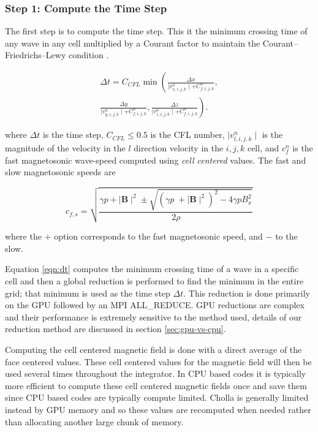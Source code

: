 \subsubsection{Step 1: Compute the Time Step}
\label{vlct:dt}

The first step is to compute the time step. This it the minimum crossing time of any wave in any cell multiplied by a Courant factor to maintain the Courant–Friedrichs–Lewy condition \cite{cfl}.

\begin{equation}
    \begin{aligned}
        \label{eqn:dt}
        \Delta t = C_{CFL} \min \left(
            \frac{\Delta x}{\mid v^n_{x,i,j,k} \mid + C^n_{f,i,j,k}}, \right. \\ \left.
            \frac{\Delta y}{\mid v^n_{y,i,j,k} \mid + C^n_{f,i,j,k}}, 
            \frac{\Delta z}{\mid v^n_{z,i,j,k} \mid + C^n_{f,i,j,k}}
        \right).
    \end{aligned}
\end{equation}

\noindent where $\Delta t$ is the time step, $C_{CFL} \leq 0.5$ is the CFL number, $\mid v^n_{l,i,j,k}\mid $ is the magnitude of the velocity in the $l$ direction velocity in the ${i,j,k}$ cell, and $c^n_f $ is the fast magnetosonic wave-speed computed using \emph{cell centered} values. The fast and slow magnetosonic speeds are

\begin{equation}
    c_{f,s} = \sqrt{\frac
    {\gamma p + \mid \boldsymbol{B} \mid^2 \pm \sqrt{\left( \gamma p \;+ \mid \boldsymbol{B} \mid^2 \right)^2 - 4\gamma p B_x^2 } }
    {2\rho}}
\end{equation}

\noindent where the $+$ option corresponds to the fast magnetosonic speed, and $-$ to the slow.

Equation \ref{eqn:dt} computes the minimum crossing time of a wave in a specific cell and then a global reduction is performed to find the minimum in the entire grid; that minimum is used as the time step $\Delta t$. This reduction is done primarily on the GPU followed by an MPI ALL\_REDUCE. GPU reductions are complex and their performance is extremely sensitive to the method used, details of our reduction method are discussed in section \ref{sec:gpu-vs-cpu}. 

Computing the cell centered magnetic field is done with a direct average of the face centered values. These cell centered values for the magnetic field will then be used several times throughout the integrator. In CPU based codes it is typically more efficient to compute these cell centered magnetic fields once and save them since CPU based codes are typically compute limited. Cholla is generally limited instead by GPU memory and so these values are recomputed when needed rather than allocating another large chunk of memory.


